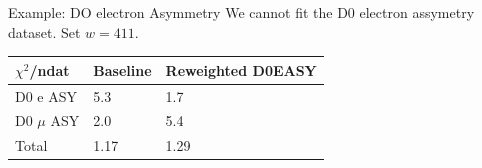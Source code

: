 \begin{frame}{Example: DO electron Asymmetry}
\protect\hypertarget{example-do-electron-asymmetry}{}
We cannot fit the D0 electron assymetry dataset. Set $w=411$.

\tiny
\begin{longtable}[]{@{}lll@{}}
\toprule
\begin{minipage}[b]{0.19\columnwidth}\raggedright
\(\chi^2\)/ndat\strut
\end{minipage} & \begin{minipage}[b]{0.14\columnwidth}\raggedright
Baseline\strut
\end{minipage} & \begin{minipage}[b]{0.28\columnwidth}\raggedright
Reweighted D0EASY\strut
\end{minipage}\tabularnewline
\midrule
\endhead
\begin{minipage}[t]{0.19\columnwidth}\raggedright
D0 e ASY\strut
\end{minipage} & \begin{minipage}[t]{0.14\columnwidth}\raggedright
5.3\strut
\end{minipage} & \begin{minipage}[t]{0.28\columnwidth}\raggedright
1.7\strut
\end{minipage}\tabularnewline
\begin{minipage}[t]{0.19\columnwidth}\raggedright
D0 \(\mu\) ASY\strut
\end{minipage} & \begin{minipage}[t]{0.14\columnwidth}\raggedright
2.0\strut
\end{minipage} & \begin{minipage}[t]{0.28\columnwidth}\raggedright
5.4\strut
\end{minipage}\tabularnewline
\begin{minipage}[t]{0.19\columnwidth}\raggedright
Total\strut
\end{minipage} & \begin{minipage}[t]{0.14\columnwidth}\raggedright
1.17\strut
\end{minipage} & \begin{minipage}[t]{0.28\columnwidth}\raggedright
1.29\strut
\end{minipage}\tabularnewline
\bottomrule
\end{longtable}
\vspace{-1.5em}


\end{frame}
